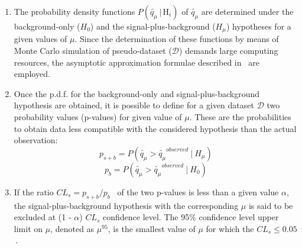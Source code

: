 \begin{enumerate}
%
%
%
	\item The probability density functions $P(\tilde{q_{\mu}} \,| \, \text{H}_i)$ of $\tilde{q_{\mu}}$ are determined  under the background-only ($H_0$) and 
	the  signal-plus-background ($H_{\mu}$) hypotheses for a  given values of $\mu$.
	Since the determination of these functions by means of Monte Carlo simulation of pseudo-dataset ($\mathcal{D}$)	demands large computing resources,
	the asymptotic approximation formulae described in~\cite{Asympt} are employed.
	

	\item Once the p.d.f. for the background-only and signal-plus-background hypothesis are obtained, 
	it is possible to define for a given dataset $\mathcal{D}$ two probability values (p-values) for  given value of $\mu$.
	These are the probabilities to obtain data less compatible with the considered hypothesis than the 
	actual observation:
	$$
	p_{s+b} = P(\tilde{q_{\mu}} > \tilde{q_{\mu}}^{observed} ~ | ~ H_{\mu})  
	$$
	$$ 
	p_{b} = P(\tilde{q_{\mu}} > \tilde{q_{\mu}}^{observed} ~ | ~ H_0)
	$$

	\item If the ratio $CL_{s} = p_{s+b} / p_{b}$~\cite{cls1,cls2} of the two p-values is less than a given value $\alpha$,
	the signal-plus-background hypothesis with the corresponding $\mu$ is said to be excluded at  (1 - $\alpha$) $CL_{s}$ confidence level. 
	The 95\% confidence level upper limit on $\mu$,
	denoted as $\mu^{95}$, is  the smallest value of $\mu$ for which the  $CL_{s} \le 0.05$\,.

\end{enumerate}

